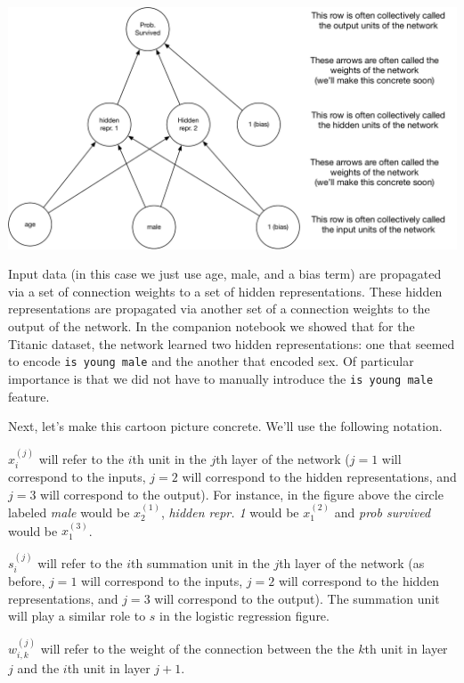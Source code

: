\documentclass[assignment06_Solutions]{subfiles}
\begin{document}
\includegraphics[width=\linewidth]{figures/titanicmlpsimple}

Input data (in this case we just use age, male, and a bias term) are propagated via a set of connection weights to a set of hidden representations.  These hidden representations are propagated via another set of a connection weights to the output of the network.   In the companion notebook we showed that for the Titanic dataset, the network learned two hidden representations: one that seemed to encode {\tt is young male} and the another that encoded sex.  Of particular importance is that we did not have to manually introduce the {\tt is young male} feature.

Next, let's make this cartoon picture concrete.  We'll use the following notation.
\bi
\item $x^{(j)}_i$ will refer to the $i$th unit in the $j$th layer of the network ($j=1$ will correspond to the inputs, $j=2$ will correspond to the hidden representations, and $j=3$ will correspond to the output).  For instance, in the figure above the circle labeled \emph{male} would be $x^{(1)}_2$, \emph{hidden repr. 1} would be $x^{(2)}_1$ and \emph{prob survived} would be $x^{(3)}_1$.
\item $s^{(j)}_i$ will refer to the $i$th summation unit in the $j$th layer of the network (as before, $j=1$ will correspond to the inputs, $j=2$ will correspond to the hidden representations, and $j=3$ will correspond to the output).  The summation unit will play a similar role to $s$ in the logistic regression figure.
\item $w^{(j)}_{i,k}$ will refer to the weight of the connection between the the $k$th unit in layer $j$ and the $i$th unit in layer $j+1$.
\ei
\end{document}
